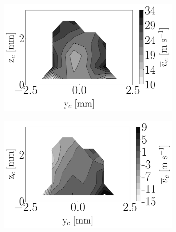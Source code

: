 \begin{figure}[h!]
\begin{subfigure}[b]{0.3\textwidth}
	\centering
   \includegraphics[scale=\scaleSLIBIMER]{./part3_applications/figures_ch8_resolved/injectors_SLI/dx10_xD05p00_ux_mean_map}
\end{subfigure}
   \hspace{0.17in}
\begin{subfigure}[b]{0.3\textwidth}
	\centering
   \includegraphics[scale=\scaleSLIBIMER]{./part3_applications/figures_ch8_resolved/injectors_SLI/dx10_xD05p00_uy_mean_map}
\end{subfigure}
   \hspace{0.17in}
\begin{subfigure}[b]{0.3\textwidth}
	\centering

\end{subfigure}
\end{figure}
